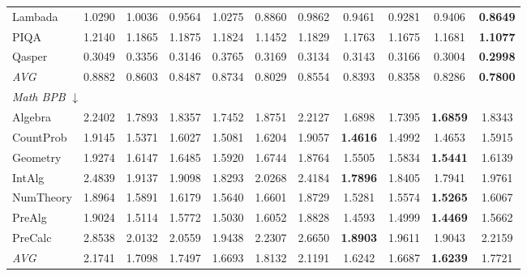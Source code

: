 \begin{table}[htbp]
\begin{tabular}{lcccccccccc}
Lambada & 1.0290 & 1.0036 & 0.9564 & 1.0275 & 0.8860 & 0.9862 & 0.9461 & 0.9281 & 0.9406 & \textbf{0.8649} \\
PIQA & 1.2140 & 1.1865 & 1.1875 & 1.1824 & 1.1452 & 1.1829 & 1.1763 & 1.1675 & 1.1681 & \textbf{1.1077} \\
Qasper & 0.3049 & 0.3356 & 0.3146 & 0.3765 & 0.3169 & 0.3134 & 0.3143 & 0.3166 & 0.3004 & \textbf{0.2998} \\
\textit{AVG} & 0.8882 & 0.8603 & 0.8487 & 0.8734 & 0.8029 & 0.8554 & 0.8393 & 0.8358 & 0.8286 & \textbf{0.7800} \\
\midrule
\multicolumn{11}{l}{\textit{Math BPB} $\downarrow$} \\
Algebra & 2.2402 & 1.7893 & 1.8357 & 1.7452 & 1.8751 & 2.2127 & 1.6898 & 1.7395 & \textbf{1.6859} & 1.8343 \\
CountProb & 1.9145 & 1.5371 & 1.6027 & 1.5081 & 1.6204 & 1.9057 & \textbf{1.4616} & 1.4992 & 1.4653 & 1.5915 \\
Geometry & 1.9274 & 1.6147 & 1.6485 & 1.5920 & 1.6744 & 1.8764 & 1.5505 & 1.5834 & \textbf{1.5441} & 1.6139 \\
IntAlg & 2.4839 & 1.9137 & 1.9098 & 1.8293 & 2.0268 & 2.4184 & \textbf{1.7896} & 1.8405 & 1.7941 & 1.9761 \\
NumTheory & 1.8964 & 1.5891 & 1.6179 & 1.5640 & 1.6601 & 1.8729 & 1.5281 & 1.5574 & \textbf{1.5265} & 1.6067 \\
PreAlg & 1.9024 & 1.5114 & 1.5772 & 1.5030 & 1.6052 & 1.8828 & 1.4593 & 1.4999 & \textbf{1.4469} & 1.5662 \\
PreCalc & 2.8538 & 2.0132 & 2.0559 & 1.9438 & 2.2307 & 2.6650 & \textbf{1.8903} & 1.9611 & 1.9043 & 2.2159 \\
\textit{AVG} & 2.1741 & 1.7098 & 1.7497 & 1.6693 & 1.8132 & 2.1191 & 1.6242 & 1.6687 & \textbf{1.6239} & 1.7721 \\
\bottomrule
\end{tabular}
\end{table}

